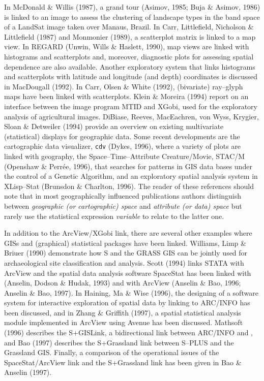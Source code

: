 In McDonald \& Willis (1987), a grand tour (Asimov, 1985; Buja \&
Asimov, 1986) is linked to an image to assess the clustering of
landscape types in the band space of a LandSat image taken over
Manaus, Brazil. In Carr, Littlefield,
Nicholson \& Littlefield (1987) and Monmonier (1989), a scatterplot
matrix is linked to a map view.  In REGARD (Unwin, Wills \& Haslett,
1990), map views are linked with histograms and scatterplots and,
moreover, diagnostic plots for assessing spatial dependence are also
available. Another exploratory system that links histograms and
scatterplots with latitude and longitude (and depth) coordinates is
discussed in MacDougall (1992).  In Carr, Olsen \& White (1992),
(bivariate) ray--glyph maps have been linked with scatterplots.
Klein \& Moreira (1994) report on an
interface between the image program MTID and XGobi, used for the
exploratory analysis of agricultural images.  
DiBiase, Reeves, MacEachren, von Wyss, Krygier, Sloan \& Detweiler
(1994) provide an overview on existing multivariate (statistical)
displays for geographic data.  Some recent
developments are the cartographic data visualizer, {\tt cdv} (Dykes,
1996), where a variety of plots are linked with geography, the
Space--Time--Attribute Creature/Movie, STAC/M (Openshaw \& Perr{\'e}e,
1996), that searches for patterns in GIS data bases under the control
of a Genetic Algorithm, and an exploratory spatial analysis system in
XLisp--Stat (Brunsdon \& Charlton, 1996).  The reader of these
references should note that in most geographically influenced
publications authors distinguish between {\it geographic (or
cartographic) space} and {\it attribute (or data) space} but rarely
use the statistical expression {\it variable} to relate to the latter
one.

In addition to the ArcView/XGobi link, there are several other examples
where GISs and (graphical) statistical packages have been linked.
Williams, Limp \& Briuer (1990) demonstrate how S and the GRASS GIS
can be jointly used for archaeological site classification and analysis.
Scott (1994) links STATA with ArcView and the spatial data analysis
software SpaceStat has been linked with \ARCINFOTMfn\/ (Anselin,
Dodson \& Hudak, 1993) and with ArcView 
(Anselin \& Bao, 1996; Anselin \& Bao, 1997). 
In Haining, Ma \& Wise (1996), the designing of a software system for
interactive exploration of spatial data by linking to ARC/INFO has
been discussed, and in Zhang \& Griffith (1997), a spatial statistical
analysis module implemented in ArcView using Avenue has been discussed. 
Mathsoft (1996) describes the S+GISLink, a
bidirectional link between ARC/INFO and \SPLUSRfn, and Bao (1997)
describes the S+Grassland link between S--PLUS and the Grassland
GIS. Finally, a comparison of the operational issues of the
SpaceStat/ArcView link and the S+Grassland link has been given in Bao
\& Anselin (1997).


